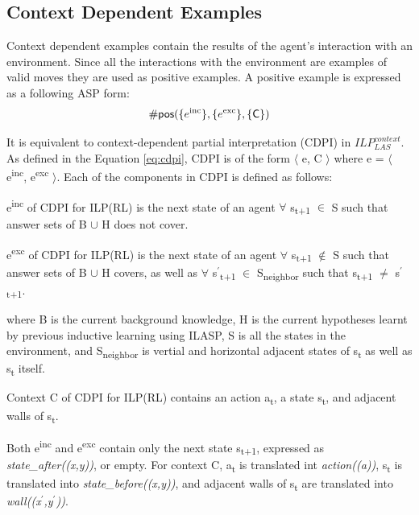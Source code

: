 \subsection{Context Dependent Examples}
Context dependent examples contain the results of the agent's interaction with an environment. Since all the interactions with the environment are examples of valid moves
they are used as positive examples. A positive example is expressed as a following ASP form:
\begin{equation}
\begin{split}
    \textsf{\#pos}(\{e\textsuperscript{inc}\}, \{e\textsuperscript{exc}\}, \textsf{\{C\}})
\end{split}
\end{equation}

It is equivalent to context-dependent partial interpretation (CDPI) in  $ILP_{LAS}^{context}$. 
As defined in the Equation \ref{eq:cdpi}, CDPI is of the form $\langle$ e, C $\rangle$ where e = $\langle$ e\textsuperscript{inc}, e\textsuperscript{exc} $\rangle$. 
Each of the components in CDPI is defined as follows:
\begin{defn} \label{def:ILPRL_inc}
e\textsuperscript{inc} of CDPI for ILP(RL) is the next state of an agent $\forall$ s\textsubscript{t+1} $\in$ S such that answer sets of B $\cup$ H does not cover.
\end{defn}

\begin{defn} \label{def:ILPRL_exc}
e\textsuperscript{exc} of CDPI for ILP(RL) is the next state of an agent $\forall$ s\textsubscript{t+1} $\not\in$ S such that answer sets of B $\cup$ H covers,
as well as $\forall$ s$^\prime$\textsubscript{t+1} $\in$ S\textsubscript{neighbor} such that s\textsubscript{t+1} $\neq$ s$^\prime$\textsubscript{t+1}.
\end{defn}
where B is the current background knowledge, H is the current hypotheses learnt by previous inductive learning using ILASP, 
S is all the states in the environment, and S\textsubscript{neighbor} is vertial and horizontal adjacent states of s\textsubscript{t} as well as s\textsubscript{t} itself.

\begin{defn}\label{def:ILPRL_context}
Context C of CDPI for ILP(RL) contains an action a\textsubscript{t}, a state s\textsubscript{t}, and adjacent walls of s\textsubscript{t}.
\label{def:context}
\end{defn}

Both e\textsuperscript{inc} and e\textsuperscript{exc} contain only the next state s\textsubscript{t+1}, expressed as \textit{state\_after((x,y))}, or empty.
For context C, a\textsubscript{t} is translated int \textit{action((a))}, s\textsubscript{t} is translated into \textit{state\_before((x,y))}, and adjacent walls of s\textsubscript{t} are translated into \textit{wall((x$^\prime$,y$^\prime$))}.

